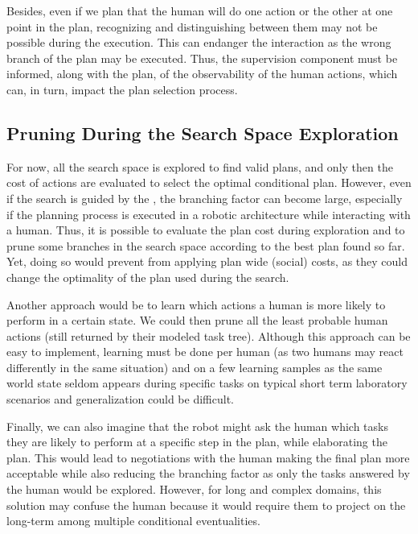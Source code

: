 \documentclass[a4paper,11pt,twoside]{StyleThese}
\begin{document}
Besides, even if we plan that the human will do one action or the other at one point in the plan, recognizing and distinguishing between them may not be possible during the execution. This can endanger the interaction as the wrong branch of the plan may be executed. Thus, the supervision component must be informed, along with the plan, of the observability of the human actions, which can, in turn, impact the plan selection process.


\subsection{Pruning During the Search Space Exploration}
For now, all the search space is explored to find valid plans, and only then the cost of actions are evaluated to select the optimal conditional plan. However, even if the search is guided by the , the branching factor can become large, especially if the planning process is executed in a robotic architecture while interacting with a human. Thus, it is possible to evaluate the plan cost during exploration and to prune some branches in the search space according to the best plan found so far. Yet, doing so would prevent from applying plan wide (social) costs, as they could change the optimality of the plan used during the search.

Another approach would be to learn which actions a human is more likely to perform in a certain state. We could then prune all the least probable human actions (still returned by their modeled task tree). Although this approach can be easy to implement, learning must be done per human (as two humans may react differently in the same situation) and on a few learning samples as the same world state seldom appears during specific tasks on typical short term laboratory scenarios and generalization could be difficult.

Finally, we can also imagine that the robot might ask the human which tasks they are likely to perform at a specific step in the plan, while elaborating the plan. This would lead to negotiations with the human making the final plan more acceptable while also reducing the branching factor as only the tasks answered by the human would be explored. However, for long and complex domains, this solution may confuse the human because it would require them to project on the long-term among multiple conditional eventualities.
\end{document}
